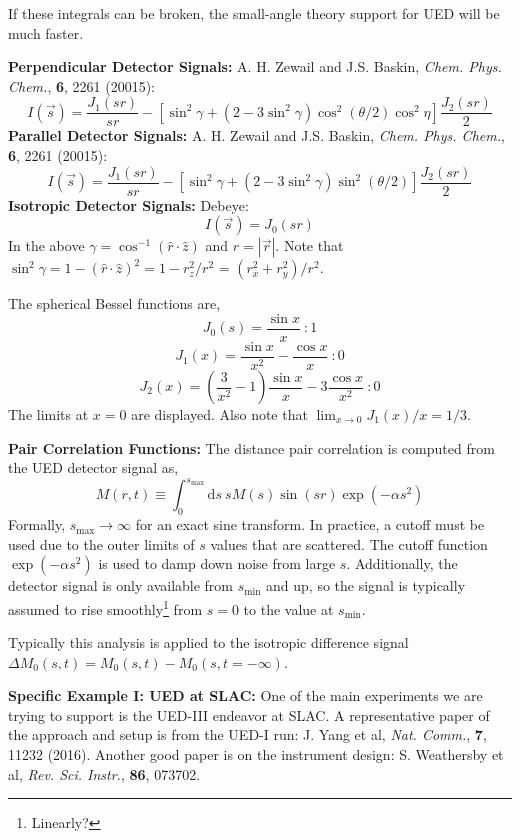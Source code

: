 \documentclass[fleqn,oneside,12pt]{article}
\begin{document}
If these integrals can be broken, the small-angle theory support for UED will be
much faster.

\textbf{Perpendicular Detector Signals:} A. H. Zewail and J.S. Baskin,
\textit{Chem. Phys. Chem.}, \textbf{6}, 2261 (20015):
\[
I (\vec s)
=
\frac{J_{1} (s r)}{sr}
-
\left [
\sin^2 \gamma
+
(
2 
-
3 
\sin^2 \gamma
)
\cos^2 (\theta / 2)
\cos^2 \eta
\right ]
\frac{J_{2} (s r)}{2}
\]
\textbf{Parallel Detector Signals:} A. H. Zewail and J.S. Baskin,
\textit{Chem. Phys. Chem.}, \textbf{6}, 2261 (20015):
\[
I (\vec s)
=
\frac{J_{1} (s r)}{sr}
-
\left [
\sin^2 \gamma
+
(
2 
-
3 
\sin^2 \gamma
)
\sin^2 (\theta / 2)
\right ]
\frac{J_{2} (s r)}{2}
\]
\textbf{Isotropic Detector Signals:} Debeye:
\[
I (\vec s)
=
J_{0} (sr)
\]
In the above $\gamma = \cos^{-1} (\hat r \cdot \hat z)$ and $r = | \vec r |$.
Note that $\sin^2 \gamma = 1 - (\hat r \cdot \hat z)^2 = 1 - r_{z}^2 / r^2$ =
$(r_{x}^2 + r_{y}^2) / r^2$.

The spherical Bessel functions are,
\[
J_{0} (s)
=
\frac{\sin x}{x}
\
:
1
\]
\[
J_{1} (x)
=
\frac{\sin x}{x^2}
-
\frac{\cos x}{x}
\
:
0
\]
\[
J_{2} (x)
=
\left (
\frac{3}{x^2} - 1
\right )
\frac{\sin x}{x}
-
3
\frac{\cos x}{x^2}
\
:
0
\]
The limits at $x = 0$ are displayed. Also note that $\lim_{x \rightarrow 0} J_{1}
(x) / x = 1 /3$.

\textbf{Pair Correlation Functions:} The distance pair correlation is computed
from the UED detector signal as,
\[
M (r, t)
\equiv
\int_{0}^{s_{\mathrm{max}}}
\mathrm{d} s \
s M(s)
\sin (sr)
\exp(-\alpha s^2)
\]
Formally, $s_{\mathrm{max}} \rightarrow \infty$ for an exact sine transform. In
practice, a cutoff must be used due to the outer limits of $s$ values that are
scattered. The cutoff function $\exp(-\alpha s^2)$ is used to damp down noise
from large $s$. Additionally, the detector signal is only available from
$s_{\mathrm{min}}$ and up, so the signal is typically assumed to rise
smoothly\footnote{Linearly?} from $s=0$ to the value at $s_{\mathrm{min}}$.

Typically this analysis is applied to the isotropic difference signal $\Delta
M_{0} (s, t) = M_{0} (s, t) - M_{0} (s, t = -\infty)$.

\textbf{Specific Example I: UED at SLAC:} One of the main experiments we are
trying to support is the UED-III endeavor at SLAC. A representative paper of the
approach and setup is from the UED-I run: J. Yang et al, \emph{Nat. Comm.},
\textbf{7}, 11232 (2016). Another good paper is on the instrument design: S.
Weathersby et al, \emph{Rev. Sci. Instr.}, \textbf{86}, 073702. 
\end{document}
